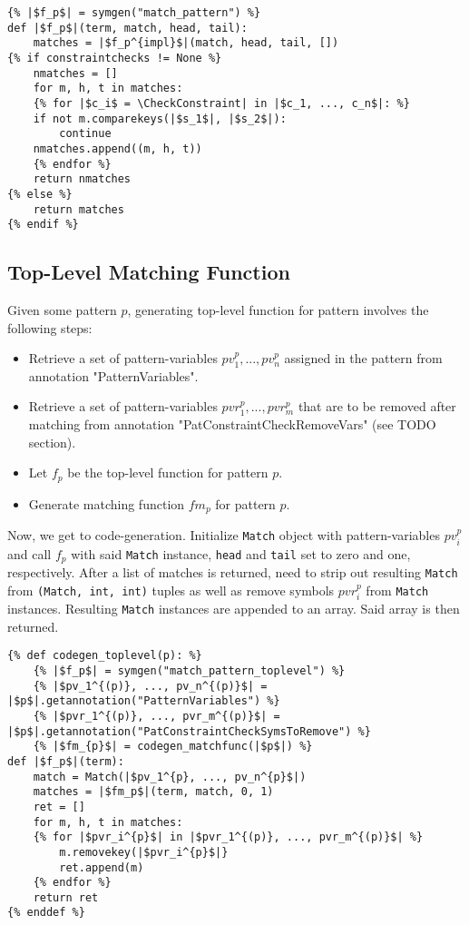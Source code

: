 \begin{verbatim}
{% |$f_p$| = symgen("match_pattern") %}
def |$f_p$|(term, match, head, tail):
	matches = |$f_p^{impl}$|(match, head, tail, [])
{% if constraintchecks != None %}
	nmatches = []
	for m, h, t in matches:
	{% for |$c_i$ = \CheckConstraint| in |$c_1, ..., c_n$|: %}
	if not m.comparekeys(|$s_1$|, |$s_2$|):
		continue
	nmatches.append((m, h, t))
	{% endfor %}
	return nmatches
{% else %}
	return matches
{% endif %}
\end{verbatim} 

\subsection{Top-Level Matching Function}
Given some pattern $p$, generating top-level function for pattern involves the following steps: 

\begin{itemize}
\item Retrieve a set of pattern-variables $pv_1^{p}, ..., pv_n^{p}$ assigned in the pattern from annotation "PatternVariables".
\item Retrieve a set of pattern-variables $pvr_1^{p}, ..., pvr_m^{p}$ that are to be removed after matching from annotation "PatConstraintCheckRemoveVars" (see TODO section).
\item Let $f_p$ be the top-level function for pattern $p$.
\item Generate matching function $fm_p$ for pattern $p$.
\end{itemize}

Now, we get to code-generation. Initialize \texttt{Match} object with pattern-variables $pv_i^{p}$ and call $f_p$ with said \texttt{Match} instance, \texttt{head} and \texttt{tail} set to zero and one, respectively. After a list of matches is returned, need to strip out resulting \texttt{Match} from \texttt{(Match, int, int)}  tuples as well as remove symbols $pvr_i^{p}$ from \texttt{Match} instances. Resulting \texttt{Match} instances are appended to an array. Said array is then returned.


\begin{verbatim}
{% def codegen_toplevel(p): %}
	{% |$f_p$| = symgen("match_pattern_toplevel") %}
	{% |$pv_1^{(p)}, ..., pv_n^{(p)}$| = |$p$|.getannotation("PatternVariables") %}
	{% |$pvr_1^{(p)}, ..., pvr_m^{(p)}$| = |$p$|.getannotation("PatConstraintCheckSymsToRemove") %}
	{% |$fm_{p}$| = codegen_matchfunc(|$p$|) %}
def |$f_p$|(term):
	match = Match(|$pv_1^{p}, ..., pv_n^{p}$|)
	matches = |$fm_p$|(term, match, 0, 1)
	ret = []	
	for m, h, t in matches:
	{% for |$pvr_i^{p}$| in |$pvr_1^{(p)}, ..., pvr_m^{(p)}$| %}
		m.removekey(|$pvr_i^{p}$|}
		ret.append(m)
	{% endfor %}
	return ret
{% enddef %}
\end{verbatim} 
